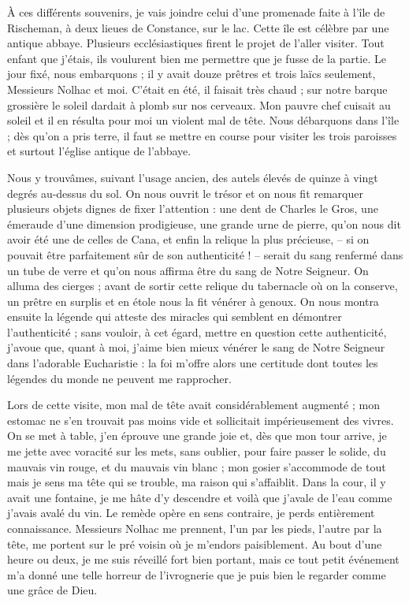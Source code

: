 \documentclass[11pt,a4paper]{report}
\begin{document}
À ces différents souvenirs, je vais joindre celui d'une promenade faite à l'île de Rischeman, à deux lieues de Constance, sur le lac. Cette île est célèbre par une antique abbaye. Plusieurs ecclésiastiques firent le projet de l'aller visiter. Tout enfant que j'étais, ils voulurent bien me permettre que je fusse de la partie. Le jour fixé, nous embarquons ; il y avait douze prêtres et trois laïcs seulement, Messieurs Nolhac et moi. C'était en été, il faisait très chaud ; sur notre barque grossière le soleil dardait à plomb sur nos cerveaux. Mon pauvre chef cuisait au soleil et il en résulta pour moi un violent mal de tête. Nous débarquons dans l'île ; dès qu'on a pris terre, il faut se mettre en course pour visiter les trois paroisses et surtout l'église antique de l'abbaye.

Nous y trouvâmes, suivant l'usage ancien, des autels élevés de quinze à vingt degrés au-dessus du sol. On nous ouvrit le trésor et on nous fit remarquer plusieurs objets dignes de fixer l'attention : une dent de Charles le Gros, une émeraude d'une dimension prodigieuse, une grande urne de pierre, qu'on nous dit avoir été une de celles de Cana, et enfin la relique la plus précieuse, -- si on pouvait être parfaitement sûr de son authenticité ! -- serait du sang renfermé dans un tube de verre et qu'on nous affirma être du sang de Notre Seigneur. On alluma des cierges ; avant de sortir cette relique du tabernacle où on la conserve, un prêtre en surplis et en étole nous la fit vénérer à genoux. On nous montra ensuite la légende qui atteste des miracles qui semblent en démontrer l'authenticité ; sans vouloir, à cet égard, mettre en question cette authenticité, j'avoue que, quant à moi, j'aime bien mieux vénérer le sang de Notre Seigneur dans l'adorable Eucharistie : la foi m'offre alors une certitude dont toutes les légendes du monde ne peuvent me rapprocher.

Lors de cette visite, mon mal de tête avait considérablement augmenté ; mon estomac ne s'en trouvait pas moins vide et sollicitait impérieusement des vivres. On se met à table, j'en éprouve une grande joie et, dès que mon tour arrive, je me jette avec voracité sur les mets, sans oublier, pour faire passer le solide, du mauvais vin rouge, et du mauvais vin blanc ; mon gosier s'accommode de tout mais je sens ma tête qui se trouble, ma raison qui s'affaiblit. Dans la cour, il y avait une fontaine, je me hâte d'y descendre et voilà que j'avale de l'eau comme j'avais avalé du vin. Le remède opère en sens contraire, je perds entièrement connaissance. Messieurs Nolhac me prennent, l'un par les pieds, l'autre par la tête, me portent sur le pré voisin où je m'endors paisiblement. Au bout d'une heure ou deux, je me suis réveillé fort bien portant, mais ce tout petit événement m'a donné une telle horreur de l'ivrognerie que je puis bien le regarder comme une grâce de Dieu.
\end{document}
